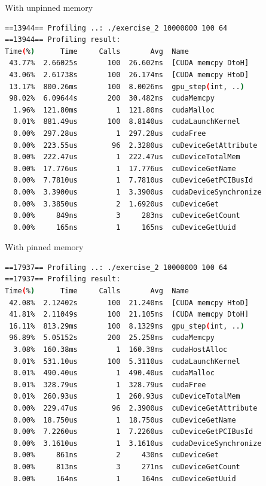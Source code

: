 \documentclass{article}
\begin{document}
With unpinned memory 

\begin{mdframed}[backgroundcolor=codeColor,leftmargin=0.0cm,hidealllines=true,%
  innerleftmargin=0.1cm,innerrightmargin=0.1cm,innertopmargin=0.5cm,innerbottommargin=0.10cm,
  roundcorner=15pt]
\begin{lstlisting}[language=bash]
==13944== Profiling ..: ./exercise_2 10000000 100 64
==13944== Profiling result:
Time(%)      Time     Calls       Avg  Name
 43.77%  2.66025s       100  26.602ms  [CUDA memcpy DtoH]
 43.06%  2.61738s       100  26.174ms  [CUDA memcpy HtoD]
 13.17%  800.26ms       100  8.0026ms  gpu_step(int, ..)
 98.02%  6.09644s       200  30.482ms  cudaMemcpy
  1.96%  121.80ms         1  121.80ms  cudaMalloc
  0.01%  881.49us       100  8.8140us  cudaLaunchKernel
  0.00%  297.28us         1  297.28us  cudaFree
  0.00%  223.55us        96  2.3280us  cuDeviceGetAttribute
  0.00%  222.47us         1  222.47us  cuDeviceTotalMem
  0.00%  17.776us         1  17.776us  cuDeviceGetName
  0.00%  7.7810us         1  7.7810us  cuDeviceGetPCIBusId
  0.00%  3.3900us         1  3.3900us  cudaDeviceSynchronize
  0.00%  3.3850us         2  1.6920us  cuDeviceGet
  0.00%     849ns         3     283ns  cuDeviceGetCount
  0.00%     165ns         1     165ns  cuDeviceGetUuid
\end{lstlisting}
\end{mdframed}

\newpage 

With pinned memory
\begin{mdframed}[backgroundcolor=codeColor,leftmargin=0.0cm,hidealllines=true,%
  innerleftmargin=0.1cm,innerrightmargin=0.1cm,innertopmargin=0.5cm,innerbottommargin=0.10cm,
  roundcorner=15pt]
\begin{lstlisting}[language=bash]
==17937== Profiling ..: ./exercise_2 10000000 100 64
==17937== Profiling result:
Time(%)      Time     Calls       Avg  Name
 42.08%  2.12402s       100  21.240ms  [CUDA memcpy HtoD]
 41.81%  2.11049s       100  21.105ms  [CUDA memcpy DtoH]
 16.11%  813.29ms       100  8.1329ms  gpu_step(int, ..)
 96.89%  5.05152s       200  25.258ms  cudaMemcpy
  3.08%  160.38ms         1  160.38ms  cudaHostAlloc
  0.01%  531.10us       100  5.3110us  cudaLaunchKernel
  0.01%  490.40us         1  490.40us  cudaMalloc
  0.01%  328.79us         1  328.79us  cudaFree
  0.01%  260.93us         1  260.93us  cuDeviceTotalMem
  0.00%  229.47us        96  2.3900us  cuDeviceGetAttribute
  0.00%  18.750us         1  18.750us  cuDeviceGetName
  0.00%  7.2260us         1  7.2260us  cuDeviceGetPCIBusId
  0.00%  3.1610us         1  3.1610us  cudaDeviceSynchronize
  0.00%     861ns         2     430ns  cuDeviceGet
  0.00%     813ns         3     271ns  cuDeviceGetCount
  0.00%     164ns         1     164ns  cuDeviceGetUuid
\end{lstlisting}
\end{mdframed}
\end{document}
